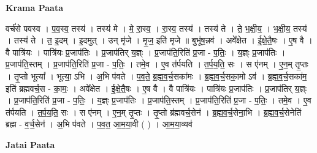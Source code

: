 \documentclass[17pt]{extarticle}
\begin{document}
\textbf{Krama Paata} \newline

वर्च॑से पवस्व । प॒व॒स्व॒ तस्य॑ । तस्य॑ मे । मे॒ रा॒स्व॒ । रा॒स्व॒ तस्य॑ । तस्य॑ ते । ते॒ भ॒क्षी॒य॒ । भ॒क्षी॒य॒ तस्य॑ । तस्य॑ ते । त॒ इ॒दम् । इ॒दमुत् । उन् मृ॑जे । मृ॒ज॒ इति॑ मृजे ॥ बुभू॑ष॒न्नव॑ । अवे᳚क्षेत । ई॒क्षे॒तै॒षः । ए॒ष वै । वै पात्रि॑यः । पात्रि॑यः प्र॒जाप॑तिः । प्र॒जाप॑तिर् य॒ज्ञ्ः । प्र॒जाप॑ति॒रिति॑ प्र॒जा - प॒तिः॒ । य॒ज्ञ्ः प्र॒जाप॑तिः । प्र॒जाप॑ति॒स्तम् । प्र॒जाप॑ति॒रिति॑ प्र॒जा - प॒तिः॒ । तमे॒व । ए॒व त॑र्पयति । त॒र्प॒य॒ति॒ सः । स ए॑नम् । ए॒न॒म् तृ॒प्तः । तृ॒प्तो भूत्या᳚ । भूत्या॒ ऽभि । अ॒भि प॑वते । प॒व॒ते॒ ब्र॒ह्म॒व॒र्च॒सका॑मः । ब्र॒ह्म॒व॒र्च॒सका॒मो ऽव॑ । ब्र॒ह्म॒व॒र्च॒सका॑म॒ इति॑ ब्रह्मवर्च॒स - का॒मः॒ । अवे᳚क्षेत । ई॒क्षे॒तै॒षः । ए॒ष वै । वै पात्रि॑यः । पात्रि॑यः प्र॒जाप॑तिः । प्र॒जाप॑तिर् य॒ज्ञ्ः । प्र॒जाप॑ति॒रिति॑ प्र॒जा - प॒तिः॒ । य॒ज्ञ्ः प्र॒जाप॑तिः । प्र॒जाप॑ति॒स्तम् । प्र॒जाप॑ति॒रिति॑ प्र॒जा - प॒तिः॒ । तमे॒व । ए॒व त॑र्पयति । त॒र्प॒य॒ति॒ सः । स ए॑नम् । ए॒न॒म् तृ॒प्तः । तृ॒प्तो ब्र॑ह्मवर्च॒सेन॑ । ब्र॒ह्म॒व॒र्च॒सेना॒भि । ब्र॒ह्म॒व॒र्च॒सेनेति॑ ब्रह्म - व॒र्च॒सेन॑ । अ॒भि प॑वते । प॒व॒त॒ आ॒म॒या॒वी ( ) । आ॒म॒या॒व्यव॑ \newline

\textbf{Jatai Paata} \newline
\end{document}
